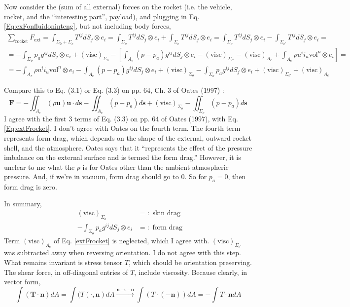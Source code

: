 \documentclass[10pt]{amsart}
\begin{document}
\begin{multicols*}{2}
Now consider the (sum of all external) forces on the rocket (i.e. the vehicle, rocket, and the ``interesting part'', payload), and plugging in Eq. \ref{Eq:exFonfluidoninteng}, but not including body forces,
\begin{equation}\label{Eq:extFrocket}
\begin{gathered}
  \sum_{\text{rocket}} F_{\text{ext}} = \int_{ \Sigma_0 + \Sigma_c } T^{ij} dS_j \otimes e_i   = \int_{\Sigma_o} T^{ij} dS_j \otimes e_i + \int_{\Sigma_c} T^{ij}dS_j \otimes e_i =  \int_{\Sigma_o} T^{ij} dS_j \otimes e_i - \int_{\Sigma_{c'}} T^{ij}dS_j \otimes e_i = \\
  = -\int_{\Sigma_o} p_a g^{ij} dS_j \otimes e_i + (\text{visc})_{\Sigma_o} - \left[ \int_{A_e} (p-p_a) g^{ij} dS_j \otimes e_i - (\text{visc})_{\Sigma_{c'} } - (\text{visc})_{A_e} + \int_{A_e} \rho u^i i_u \text{vol}^n \otimes e_i \right] = \\
  = -\int_{A_e} \rho u^i i_u \text{vol}^n \otimes e_i - \int_{A_e} (p-p_a) g^{ij} dS_j \otimes e_i + (\text{visc})_{\Sigma_o}  -\int_{\Sigma_o} p_a g^{ij} dS_j \otimes e_i + (\text{visc})_{\Sigma_{c'} } + (\text{visc})_{A_e}
\end{gathered}
\end{equation}

Compare this to Eq. (3.1) or Eq. (3.3) on pp. 64, Ch. 3 of Oates (1997) \cite{GOates1997}:
\[
\mathbf{F} = -\iint_{A_e} (\rho \mathbf{u}) \mathbf{u}\cdot d\mathbf{s} - \iint_{A_e} (p-p_a) d\mathbf{s} + (\text{visc})_{\Sigma_o} - \iint_{\Sigma_o} (p-p_a) d\mathbf{s}
\]
I agree with the first 3 terms of Eq. (3.3) on pp. 64 of Oates (1997), with Eq. \ref{Eq:extFrocket}.  I don't agree with Oates on the fourth term.  The fourth term represents form drag, which depends on the shape of the external, outward rocket shell, and the atmosphere.  Oates says that it ``represents the effect of the pressure imbalance on the external surface and is termed the form drag.'' However, it is unclear to me what the $p$ is for Oates \cite{GOates1997} other than the ambient atmospheric pressure.  And, if we're in vacuum, form drag should go to $0$.  So for $p_a=0$, then form drag is zero.  

In summary,
\[
\begin{aligned}
  & (\text{visc})_{\Sigma_o} & =: \text{ skin drag } \\
  & -\int_{\Sigma_o} p_a g^{ij} dS_j \otimes e_i & =: \text{ form drag }
\end{aligned}
\]
Term $(\text{visc})_{A_e}$ of Eq. \ref{extFrocket} is neglected, which I agree with.  $(\text{visc})_{\Sigma_{c'}}$ was subtracted away when reversing orientation.  I do not agree with this step.  What remains invariant is stress tensor $T$, which should be orientation preserving.  The shear force, in off-diagonal entries of $T$, include viscosity.  Because clearly, in vector form, 
\[
\int (\mathbf{T} \cdot \mathbf{n} ) dA = \int ( T(\cdot , \mathbf{n} ) dA \xrightarrow{ \mathbf{n} \to -\mathbf{n} } \int (T\cdot (-\mathbf{n} ) ) dA = -\int T\cdot \mathbf{n} dA
\]


\end{multicols*}
\end{document}

